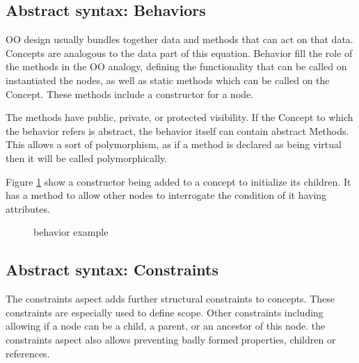 \subsection{Abstract syntax: Behaviors}
OO design usually bundles together data and methods that can act on that data.
Concepts are analogous to the data part of this equation.
Behavior fill the role of the methods in the OO analogy, defining the functionality that can be called on instantiated the nodes, as well as static methods which can be called on the Concept.
These methods include a constructor for a node.

The methods have public, private, or protected visibility.
If the Concept to which the behavior refers is abstract, the behavior itself can contain abstract Methods.
This allows a sort of polymorphism, as if a method is declared as being virtual then it will be called polymorphically.

Figure \ref{fig:behavior_example} show a constructor being added to a concept to initialize its children. 
It has a method to allow other nodes to interrogate the condition of it having attributes.

\begin{figure}[h]
    \centering
    \caption{behavior example}
    \label{fig:behavior_example}
\end{figure}
 

\subsection{Abstract syntax: Constraints}
The constraints aspect adds further structural constraints to concepts.
These constraints are especially used to define scope.
Other constraints including allowing if a node can be a child, a parent, or an ancestor of this node.
the constraints aspect also allows preventing badly formed properties, children or references.

